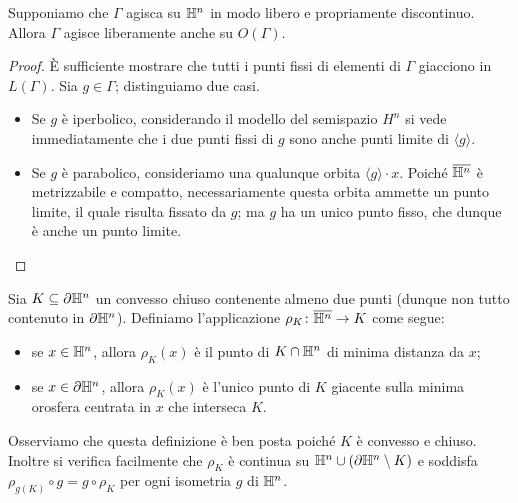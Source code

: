 \begin{proposition*}
Supponiamo che $\Gamma$ agisca su $\mathbb{H}^n$ in modo libero e propriamente discontinuo. Allora $\Gamma$ agisce liberamente anche su $O(\Gamma)$.
\end{proposition*}
\begin{proof}
È sufficiente mostrare che tutti i punti fissi di elementi di $\Gamma$ giacciono in $L(\Gamma)$. Sia $g\in\Gamma$; distinguiamo due casi.
\begin{itemize}
\item Se $g$ è iperbolico, considerando il modello del semispazio $H^n$ si vede immediatamente che i due punti fissi di $g$ sono anche punti limite di $\langle g\rangle$.
\item Se $g$ è parabolico, consideriamo una qualunque orbita $\langle g\rangle \cdot x$. Poiché $\overline{\mathbb{H}^n}$ è metrizzabile e compatto, necessariamente questa orbita ammette un punto limite, il quale risulta fissato da $g$; ma $g$ ha un unico punto fisso, che dunque è anche un punto limite.\qedhere
\end{itemize}
\end{proof}

\begin{definition*}
Sia $K\subseteq\partial\mathbb{H}^n$ un convesso chiuso contenente almeno due punti (dunque non tutto contenuto in $\partial\mathbb{H}^n$). Definiamo l'applicazione $\rho_K\colon\overline{\mathbb{H}^n}\to K$ come segue:
\begin{itemize}
\item se $x\in\mathbb{H}^n$, allora $\rho_K(x)$ è il punto di $K\cap\mathbb{H}^n$ di minima distanza da $x$;
\item se $x\in\partial\mathbb{H}^n$, allora $\rho_K(x)$ è l'unico punto di $K$ giacente sulla minima orosfera centrata in $x$ che interseca $K$.
\end{itemize}
\end{definition*}
Osserviamo che questa definizione è ben posta poiché $K$ è convesso e chiuso. Inoltre si verifica facilmente che $\rho_K$ è continua su $\mathbb{H}^n\cup(\partial\mathbb{H}^n\setminus K)$ e soddisfa $\rho_{g(K)}\circ g=g\circ\rho_K$ per ogni isometria $g$ di $\mathbb{H}^n$.

